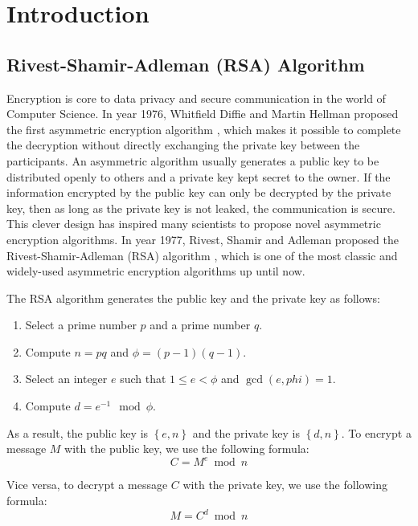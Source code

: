 
\chapter{Introduction}

\section{Rivest-Shamir-Adleman (RSA) Algorithm}

Encryption is core to data privacy and secure communication in the world of Computer Science. In year 1976, Whitfield Diffie and Martin Hellman proposed the first asymmetric encryption algorithm \cite{diffie_new_1976}, which makes it possible to complete the decryption without directly exchanging the private key between the participants. An asymmetric algorithm usually generates a public key to be distributed openly to others and a private key kept secret to the owner. If the information encrypted by the public key can only be decrypted by the private key, then as long as the private key is not leaked, the communication is secure. This clever design has inspired many scientists to propose novel asymmetric encryption algorithms. In year 1977, Rivest, Shamir and Adleman proposed the Rivest-Shamir-Adleman (RSA) algorithm \cite{rivest_method_1978}, which is one of the most classic and widely-used asymmetric encryption algorithms up until now.

The RSA algorithm generates the public key and the private key as follows:

\begin{enumerate}
  \item Select a prime number $p$ and a prime number $q$.
  \item Compute $n = pq$ and $\phi = (p-1)(q-1)$.
  \item Select an integer $e$ such that $1 \le e < \phi$ and $\gcd(e, phi) = 1$.
  \item Compute $d = e^{-1} \mod \phi$.
\end{enumerate}

As a result, the public key is $\left\{ e, n\right\}$ and the private key is $\left\{ d, n\right\}$. To encrypt a message $M$ with the public key, we use the following formula:
\begin{equation}
  C = M^e \bmod n
\end{equation}

Vice versa, to decrypt a message $C$ with the private key, we use the following formula:
\begin{equation}
  M = C^d \bmod n
\end{equation}

